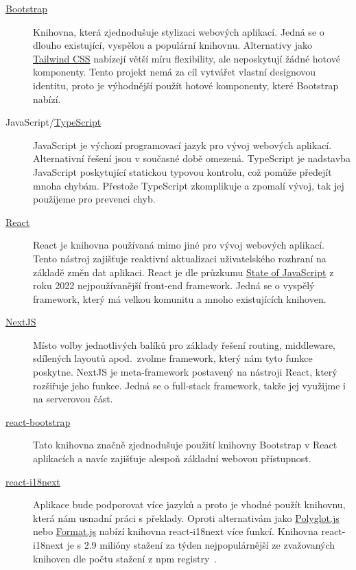 \begin{description}
    \item[\href{https://getbootstrap.com/}{Bootstrap}]
    Knihovna, která zjednodušuje stylizaci webových aplikací.
    Jedná se o dlouho existující, vyspělou a populární knihovnu.
    Alternativy jako \href{https://tailwindcss.com/}{Tailwind CSS} nabízejí větší míru flexibility, ale neposkytují žádné hotové komponenty.
    Tento projekt nemá za cíl vytvářet vlastní designovou identitu, proto je výhodnější použít hotové komponenty, které Bootstrap nabízí.
    \item[JavaScript/\href{https://www.typescriptlang.org/}{TypeScript}]
    JavaScript je výchozí programovací jazyk pro vývoj webových aplikací.
    Alternativní řešení jsou v současné době omezená.
    TypeScript je nadstavba JavaScript poskytující statickou typovou kontrolu, což pomůže předejít mnoha chybám.
    Přestože TypeScript zkomplikuje a zpomalí vývoj, tak jej použijeme pro prevenci chyb.
    \item[\href{https://react.dev/}{React}]
    React je knihovna používaná mimo jiné pro vývoj webových aplikací.
    Tento nástroj zajišťuje reaktivní aktualizaci uživatelského rozhraní na základě změn dat aplikaci.
    React je dle průzkumu \href{https://2023.stateofjs.com/en-US/libraries/front-end-frameworks/}{State of JavaScript} z roku 2022 nejpoužívanější front-end framework.
    Jedná se o vyspělý framework, který má velkou komunitu a mnoho existujících knihoven.
    \item[\href{https://nextjs.org/}{NextJS}]
    Místo volby jednotlivých balíků pro základy řešení routing, middleware, sdílených layoutů apod.\ zvolme framework, který nám tyto funkce poskytne.
    NextJS je meta-framework postavený na nástroji React, který rozšiřuje jeho funkce.
    Jedná se o full-stack framework, takže jej využijme i na serverovou část.
    \item[\href{https://react-bootstrap.github.io/}{react-bootstrap}]
    Tato knihovna značně zjednodušuje použití knihovny Bootstrap v React aplikacích a navíc zajišťuje alespoň základní webovou přístupnost.
    \item[\href{https://www.npmjs.com/package/react-i18next}{react-i18next}]
    Aplikace bude podporovat více jazyků a proto je vhodné použít knihovnu, která nám usnadní práci s překlady.
    Oproti alternativám jako \href{https://github.com/airbnb/polyglot.js}{Polyglot.js} nebo \href{https://github.com/formatjs/formatjs}{Format.js} nabízí knihovna react-i18next více funkcí.
    Knihovna react-i18next je s 2.9 milióny stažení za týden nejpopulárnější ze zvažovaných knihoven dle počtu stažení z npm registry~\cite{react-i18next-npm}.

\end{description}
